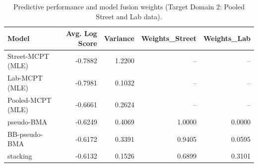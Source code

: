 \begin{table}[htbp]
\centering
\caption{Predictive performance and model fusion weights (Target Domain 2: Pooled Street and Lab data).}
\label{tab:domain2_performance}
\begin{tabular}{lrrrr}
\toprule
Model & Avg. Log Score & Variance & Weights\_Street & Weights\_Lab \\
\midrule
Street-MCPT (MLE) & -0.7882 & 1.2200 & -- & -- \\
Lab-MCPT (MLE) & -0.7981 & 0.1032 & -- & -- \\
Pooled-MCPT (MLE) & -0.6661 & 0.2624 & -- & -- \\
pseudo-BMA & -0.6249 & 0.4069 & 1.0000 & 0.0000 \\
BB-pseudo-BMA & -0.6172 & 0.3391 & 0.9405 & 0.0595 \\
stacking & -0.6132 & 0.1526 & 0.6899 & 0.3101 \\
\bottomrule
\end{tabular}
\end{table}

